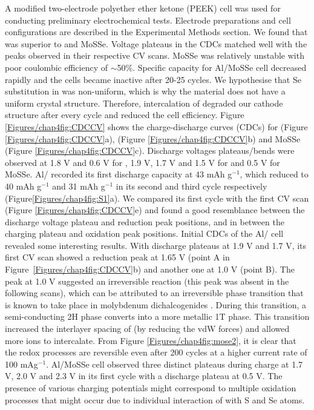 A modified two-electrode polyether ether ketone (PEEK) cell was used for conducting preliminary electrochemical tests. Electrode preparations and cell configurations are described in the Experimental Methods section. We found that  was superior to  and MoSSe. Voltage plateaus in the CDCs matched well with the peaks observed in their respective CV scans. MoSSe was relatively unstable with poor coulombic efficiency of $\sim$50\%. Specific capacity for Al/MoSSe cell decreased rapidly and the cells became inactive after 20-25 cycles. We hypothesise that Se substitution in  was non-uniform, which is why the material does not have a uniform crystal structure. Therefore, intercalation of  degraded our cathode structure after every cycle and reduced the cell efficiency.
Figure \ref{Figures/chap4fig:CDCCV} shows the charge-discharge curves (CDCs) for  (Figure \ref{Figures/chap4fig:CDCCV}a),  (Figure \ref{Figures/chap4fig:CDCCV}b) and MoSSe (Figure \ref{Figures/chap4fig:CDCCV}c). Discharge voltages plateaus/bends  were observed at 1.8 V and 0.6 V  for , 1.9 V, 1.7 V  and 1.5 V for  and 0.5 V for MoSSe. Al/  recorded its first discharge capacity at 43 mAh g$^{-1}$, which reduced to 40 mAh g$^{-1}$ and 31 mAh g$^{-1}$ in its second and third cycle respectively (Figure\ref{Figures/chap4fig:S1}a). We compared its first cycle with the first CV scan (Figure \ref{Figures/chap4fig:CDCCV}e) and found a good resemblance between the discharge voltage plateau and reduction peak positions, and in between the charging plateau and oxidation peak positions. Initial CDCs of the Al/ cell revealed some interesting results. With discharge plateaus at 1.9 V and 1.7 V, its first CV scan showed a reduction peak at 1.65 V (point A in Figure\ \ref{Figures/chap4fig:CDCCV}b) and another one at 1.0 V (point B). The peak at 1.0 V suggested an irreversible reaction (this peak was absent in the following scans), which can be attributed to an irreversible phase transition that is known to take place in molybdenum dichalcogenides \cite{fan_hybrid_2017}. During this transition, a semi-conducting 2H phase converts into a more metallic 1T phase.  This transition increased the interlayer spacing of  (by reducing the vdW forces) and allowed more  ions to intercalate. From Figure \ref{Figures/chap4fig:mose2}, it is clear that the redox processes are reversible even after 200 cycles  at a higher current rate of 100 mAg$^{-1}$. Al/MoSSe cell observed three distinct plateaus during charge at 1.7 V, 2.0 V and 2.3 V in its first cycle with a discharge plateau at 0.5 V. The presence of various charging potentials might correspond to multiple oxidation processes that might occur due to individual interaction of  with S and Se atoms. 

